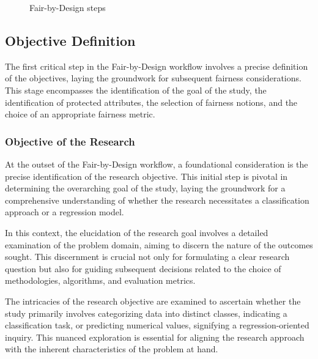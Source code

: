 \begin{figure}
    \centering
    \caption{Fair-by-Design steps}
    \label{fig:steps}
\end{figure}
    

\subsection{Objective Definition}
\label{subsection:objective}

The first critical step in the Fair-by-Design workflow involves a precise definition of the objectives, laying the groundwork for subsequent fairness considerations. This stage encompasses the identification of the goal of the study, the identification of protected attributes, the selection of fairness notions, and the choice of an appropriate fairness metric.

\subsubsection{Objective of the Research}

At the outset of the Fair-by-Design workflow, a foundational consideration is the precise identification of the research objective. This initial step is pivotal in determining the overarching goal of the study, laying the groundwork for a comprehensive understanding of whether the research necessitates a classification approach or a regression model.

In this context, the elucidation of the research goal involves a detailed examination of the problem domain, aiming to discern the nature of the outcomes sought. This discernment is crucial not only for formulating a clear research question but also for guiding subsequent decisions related to the choice of methodologies, algorithms, and evaluation metrics.

The intricacies of the research objective are examined to ascertain whether the study primarily involves categorizing data into distinct classes, indicating a classification task, or predicting numerical values, signifying a regression-oriented inquiry. This nuanced exploration is essential for aligning the research approach with the inherent characteristics of the problem at hand.

